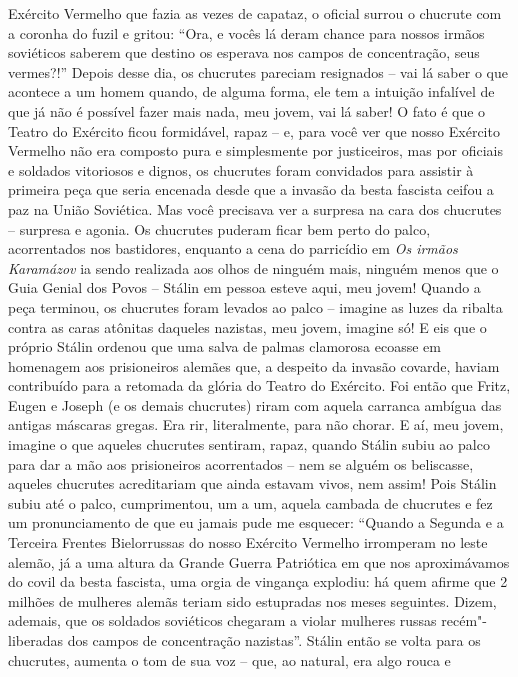 Exército Vermelho que fazia as vezes de capataz, o oficial surrou o
chucrute com a coronha do fuzil e gritou: ``Ora, e vocês lá deram chance
para nossos irmãos soviéticos saberem que destino os esperava nos campos
de concentração, seus vermes?!'' Depois desse dia, os chucrutes pareciam
resignados -- vai lá saber o que acontece a um homem quando, de alguma
forma, ele tem a intuição infalível de que já não é possível fazer mais
nada, meu jovem, vai lá saber! O fato é que o Teatro do Exército ficou
formidável, rapaz -- e, para você ver que nosso Exército Vermelho não
era composto pura e simplesmente por justiceiros, mas por oficiais e
soldados vitoriosos e dignos, os chucrutes foram convidados para
assistir à primeira peça que seria encenada desde que a invasão da besta
fascista ceifou a paz na União Soviética. Mas você precisava ver a
surpresa na cara dos chucrutes -- surpresa e agonia. Os chucrutes
puderam ficar bem perto do palco, acorrentados nos bastidores, enquanto
a cena do parricídio em \emph{Os irmãos Karamázov} ia sendo realizada
aos olhos de ninguém mais, ninguém menos que o Guia Genial dos Povos --
Stálin em pessoa esteve aqui, meu jovem! Quando a peça terminou, os
chucrutes foram levados ao palco -- imagine as luzes da ribalta contra
as caras atônitas daqueles nazistas, meu jovem, imagine só! E eis que o
próprio Stálin ordenou que uma salva de palmas clamorosa ecoasse em
homenagem aos prisioneiros alemães que, a despeito da invasão covarde,
haviam contribuído para a retomada da glória do Teatro do Exército. Foi
então que Fritz, Eugen e Joseph (e os demais chucrutes) riram com aquela
carranca ambígua das antigas máscaras gregas. Era rir, literalmente,
para não chorar. E aí, meu jovem, imagine o que aqueles chucrutes
sentiram, rapaz, quando Stálin subiu ao palco para dar a mão aos
prisioneiros acorrentados -- nem se alguém os beliscasse, aqueles
chucrutes acreditariam que ainda estavam vivos, nem assim! Pois Stálin
subiu até o palco, cumprimentou, um a um, aquela cambada de chucrutes e
fez um pronunciamento de que eu jamais pude me esquecer: ``Quando a
Segunda e a Terceira Frentes Bielorrussas do nosso Exército Vermelho
irromperam no leste alemão, já a uma altura da Grande Guerra Patriótica
em que nos aproximávamos do covil da besta fascista, uma orgia de
vingança explodiu: há quem afirme que 2 milhões de mulheres alemãs
teriam sido estupradas nos meses seguintes. Dizem, ademais, que os
soldados soviéticos chegaram a violar mulheres russas recém"-liberadas
dos campos de concentração nazistas''. Stálin então se volta para os
chucrutes, aumenta o tom de sua voz -- que, ao natural, era algo rouca e
